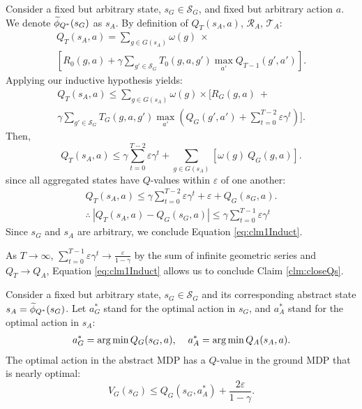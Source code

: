 Consider a fixed but arbitrary state, $s_G \in \mathcal{S}_G$, and fixed but arbitrary action $a$.
We denote $\widetilde \phi_{Q^*}(s_G)$ as $s_A$. 
By definition of $Q_{T}(s_A, a)$, $\mathcal{R}_A$, $\mathcal{T}_A$:
\begin{multline*}
Q_T(s_A, a) = \sum_{g \in G(s_A)}\omega(g)\ \times \\ 
 \left[ R_0(g,a) + \gamma \sum_{g' \in \mathcal{S}_G} T_0(g,a,g') \max_{a'} Q_{T-1}(g', a')      \right].
\end{multline*}
Applying our inductive hypothesis yields:
\begin{multline*}
Q_T(s_A, a) \leq \sum_{g \in G(s_A)}\omega(g) \times \biggl[ R_G(g,a)\ + \\ \gamma \sum_{g' \in \mathcal{S}_G} T_G(g,a,g') \max_{a'}(Q_G(g', a') + \sum_{t=0}^{T-2} \varepsilon \gamma^t) \biggr].
\end{multline*}
Then,
\begin{equation*}
Q_T(s_A, a) \leq \gamma\sum_{t=0}^{T-2} \varepsilon \gamma^t + \sum_{g \in G(s_A)}\left[ \omega(g)\ Q_G(g,a)\right].
\end{equation*}
since all aggregated states have $Q$-values within $\varepsilon$ of one another:
\begin{align*}
Q_T(s_A, a) \leq \gamma\sum_{t=0}^{T-2} \varepsilon \gamma^t + \varepsilon + Q_G(s_G, a). \\
\therefore\ \left| Q_{T}(s_A, a) - Q_G(s_G,a) \right| \leq \gamma\sum_{t=0}^{T-1}\varepsilon \gamma^t
\end{align*}
Since $s_G$ and $s_A$ are arbitrary, we conclude Equation \ref{eq:clm1Induct}.

As $T \rightarrow \infty$, $\sum_{t=0}^{T-1} \varepsilon \gamma^t \rightarrow \frac{\varepsilon}{1-\gamma}$ by the sum of infinite geometric series and $Q_T \rightarrow Q_A$, Equation \ref{eq:clm1Induct} allows us to conclude Claim \ref{clm:closeQs}.

\begin{clm}
\label{clm:optAbsActionNearOptGround}

Consider a fixed but arbitrary state, $s_G \in \mathcal{S}_G$ and its corresponding abstract state $s_A=\widetilde \phi_{Q^*}(s_G)$.
Let $a^*_G$ stand for the optimal action in $s_G$, and $a^*_A$ stand for the optimal action in $s_A$:
\begin{align*}
a^*_G = \operatorname*{arg\,min} Q_G(s_G, a), \hspace{4mm}
a^*_A = \operatorname*{arg\,min} Q_A(s_A, a).
\end{align*}
The optimal action in the abstract MDP has a $Q$-value in the ground MDP that is nearly optimal:
\begin{equation}
\label{eq:Q*Claim2}
V_G(s_G) \leq Q_G(s_G, a^*_A) + \frac{2\varepsilon}{1-\gamma}.
\end{equation}
\end{clm}


